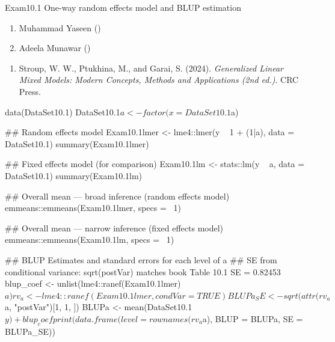 \documentclass[a4paper]{book}
\begin{document}
%
\begin{Description}
Exam10.1 One-way random effects model and BLUP estimation
\end{Description}
%
\begin{Author}
\begin{enumerate}

\item{}  Muhammad Yaseen ()
\item{} Adeela Munawar ()

\end{enumerate}

\end{Author}
%
\begin{References}
\begin{enumerate}

\item{} Stroup, W. W., Ptukhina, M., and Garai, S. (2024).
\emph{Generalized Linear Mixed Models: Modern Concepts, Methods and Applications (2nd ed.)}.
CRC Press.

\end{enumerate}

\end{References}
%
\begin{SeeAlso}
\end{SeeAlso}
%
\begin{Examples}
\begin{ExampleCode}

data(DataSet10.1)
DataSet10.1$a <- factor(x = DataSet10.1$a)

## Random effects model
Exam10.1lmer <- lme4::lmer(y ~ 1 + (1|a), data = DataSet10.1)
summary(Exam10.1lmer)

## Fixed effects model (for comparison)
Exam10.1lm <- stats::lm(y ~ a, data = DataSet10.1)
summary(Exam10.1lm)

## Overall mean — broad inference (random effects model)
emmeans::emmeans(Exam10.1lmer, specs = ~1)

## Overall mean — narrow inference (fixed effects model)
emmeans::emmeans(Exam10.1lm, specs = ~1)

## BLUP Estimates and standard errors for each level of a
## SE from conditional variance: sqrt(postVar) matches book Table 10.1 SE = 0.82453
blup_coef <- unlist(lme4::ranef(Exam10.1lmer)$a)
rv_a      <- lme4::ranef(Exam10.1lmer, condVar = TRUE)
BLUPa_SE  <- sqrt(attr(rv_a$a, "postVar")[1, 1, ])
BLUPa     <- mean(DataSet10.1$y) + blup_coef
print(data.frame(level = rownames(rv_a$a), BLUP = BLUPa, SE = BLUPa_SE))

\end{ExampleCode}
\end{Examples}
\end{document}
